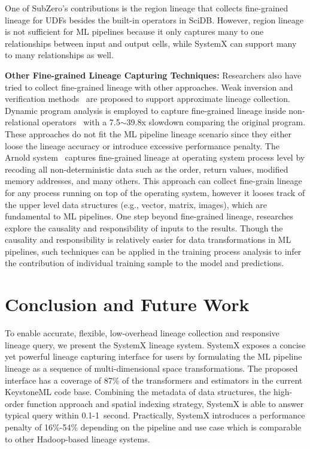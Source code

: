 \documentclass{sig-alternate}
\begin{document}
One of SubZero's contributions is the region lineage that collects fine-grained lineage for UDFs besides the built-in operators in SciDB. 
However, region lineage is not sufficient for ML pipelines because it only captures many to one relationships between input and output cells, 
while SystemX can support many to many relationships as well.

{\bf Other Fine-grained Lineage Capturing Techniques:} Researchers also have tried to collect fine-grained lineage with other approaches.
Weak inversion and verification methods~\cite{woodruff97} are proposed to support approximate lineage collection.
Dynamic program analysis is employed to capture fine-grained lineage inside non-relational operators~\cite{zhang07} with 
a 7.5$\sim$39.8x slowdown comparing the original program. 
These approaches do not fit the ML pipeline lineage scenario since they either loose the lineage accuracy or introduce
excessive performance penalty.
The Arnold system~\cite{devecsery14} captures fine-grained lineage at operating system process level by recoding
all non-deterministic data such as the order, return values, modified memory addresses, and many others. 
This approach can collect fine-grain lineage for any process running on top of the operating system, however
it looses track of the upper level data structures (e.g., vector, matrix, images), which are fundamental to ML pipelines.
One step beyond fine-grained lineage, researches~\cite{meliou10, meliou11} explore the causality and responsibility
of inputs to the results. Though the causality and responsibility is relatively easier for data transformations in ML pipelines,
such techniques can be applied in the training process analysis to infer the contribution of individual training sample to the 
model and predictions.


\section{Conclusion and Future Work}
\label{sec:Conclusion}
To enable accurate, flexible, low-overhead lineage collection and responsive lineage query, we present the SystemX lineage system.
SystemX exposes a concise yet powerful lineage capturing interface for users by formulating the ML pipeline lineage as a sequence
of multi-dimensional space transformations. The proposed interface has a coverage of 87\% of the transformers and estimators
in the current KeystoneML code base. Combining the metadata of data structures, the high-order function approach and spatial indexing
strategy, SystemX is able to answer typical query within 0.1-1~second. Practically, SystemX introduces a
performance penalty of 16\%-54\% depending on the pipeline and use case which is comparable to other Hadoop-based lineage systems.
\end{document}
